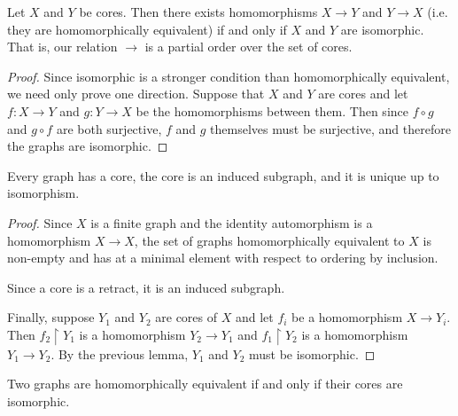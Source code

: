 \begin{lemma}
	Let $X$ and $Y$ be cores.  Then there exists homomorphisms $X\rightarrow Y$ and $Y\rightarrow X$ (i.e. they are homomorphically equivalent) if and only if $X$ and $Y$ are isomorphic.  That is, our relation $\rightarrow$ is a partial order over the set of cores.
\end{lemma}
\begin{proof}
	Since isomorphic is a stronger condition than homomorphically equivalent, we need only prove one direction.  Suppose that $X$ and $Y$ are cores and let $f:X\rightarrow Y$ and $g:Y\rightarrow X$ be the homomorphisms between them.  Then since $f\circ g$ and $g\circ f$ are both surjective, $f$ and $g$ themselves must be surjective, and therefore the graphs are isomorphic.
\end{proof}

\begin{lemma}
	Every graph has a core, the core is an induced subgraph, and it is unique up to isomorphism.
\end{lemma}
\begin{proof}
	Since $X$ is a finite graph and the identity automorphism is a homomorphism $X\rightarrow X$, the set of graphs homomorphically equivalent to $X$ is non-empty and has at a minimal element with respect to ordering by inclusion.  
	
	Since a core is a retract, it is an induced subgraph.
	
	Finally, suppose $Y_1$ and $Y_2$ are cores of $X$ and let $f_i$ be a homomorphism $X\rightarrow Y_i$.  Then $f_2\upharpoonright Y_1$ is a homomorphism $Y_2\rightarrow Y_1$ and $f_1\upharpoonright Y_2$ is a homomorphism $Y_1\rightarrow Y_2$.  By the previous lemma, $Y_1$ and $Y_2$ must be isomorphic.
\end{proof}

\begin{lemma}
	Two graphs are homomorphically equivalent if and only if their cores are isomorphic.
\end{lemma}

